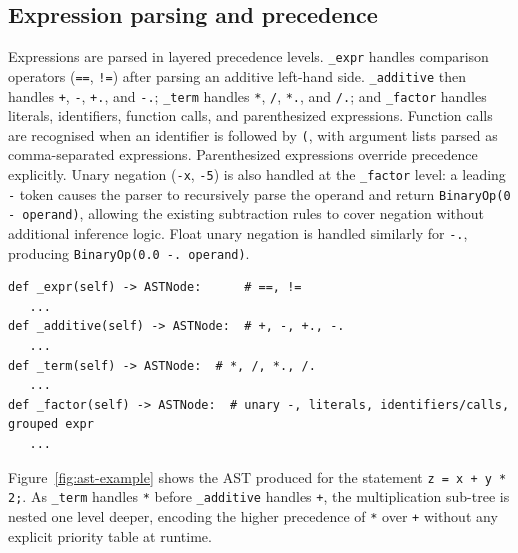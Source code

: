 \subsection{Expression parsing and precedence}
Expressions are parsed in layered precedence levels. \texttt{\_expr} handles
comparison operators (\texttt{==}, \texttt{!=}) after parsing an additive
left-hand side. \texttt{\_additive} then handles \texttt{+}, \texttt{-},
\texttt{+.}, and \texttt{-.}; \texttt{\_term} handles \texttt{*}, \texttt{/},
\texttt{*.}, and \texttt{/.}; and \texttt{\_factor} handles literals,
identifiers, function calls, and parenthesized expressions. Function calls are
recognised when an identifier is followed by \texttt{(}, with argument lists
parsed as comma-separated expressions. Parenthesized expressions override
precedence explicitly. Unary negation (\texttt{-x}, \texttt{-5}) is also
handled at the \texttt{\_factor} level: a leading \texttt{-} token causes the
parser to recursively parse the operand and return \texttt{BinaryOp(0 -
operand)}, allowing the existing subtraction rules to cover negation without
additional inference logic. Float unary negation is handled similarly for
\texttt{-.}, producing \texttt{BinaryOp(0.0 -. operand)}.

\begin{lstlisting}
def _expr(self) -> ASTNode:      # ==, !=
   ...
def _additive(self) -> ASTNode:  # +, -, +., -.
   ...
def _term(self) -> ASTNode:  # *, /, *., /.
   ...
def _factor(self) -> ASTNode:  # unary -, literals, identifiers/calls, grouped expr
   ...
\end{lstlisting}

Figure~\ref{fig:ast-example} shows the AST produced for the statement
\texttt{z = x + y * 2;}. As \texttt{\_term} handles \texttt{*} before
\texttt{\_additive} handles \texttt{+}, the multiplication sub-tree is nested one
level deeper, encoding the higher precedence of \texttt{*} over \texttt{+}
without any explicit priority table at runtime.

